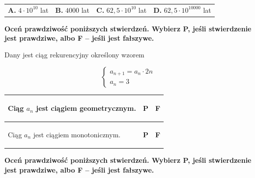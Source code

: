 \documentclass[12pt,a4paper]{article}
\theoremstyle{break}
\begin{document}
	\vspace{0.5cm}
	\begin{tabular}{p{3.5cm} p{3.5cm} p{3.5cm} p{3.5cm}}
		\textbf{A. }$4\cdot10^{10}$ lat&
		\textbf{B. }$4000$ lat&
		\textbf{C. }$62,5\cdot10^{10}$ lat&
		\textbf{D. }$62,5\cdot 10^{10000} $ lat\\
	\end{tabular}
	\newpage
	
	
	\begin{zad}[0-1]
		\textbf{Oceń prawdziwość poniższych stwierdzeń. Wybierz P, jeśli stwierdzenie jest prawdziwe, albo F – jeśli jest fałszywe.}
	\end{zad} 
	
	Dany jest ciąg rekurencyjny określony wzorem
	
	$$\left\{\begin{array}{l}
		a_{n+1}=a_n\cdot2n\\
		a_n=3
	\end{array}\right.$$
	
	\vspace{0.5cm}
	\begin{tabular}{|p{12.5cm}|p{1cm}|p{1cm}|}

		\hline
		\begin{flushleft}
			Ciąg $a_n$ jest ciągiem geometrycznym.
		\end{flushleft}&\begin{center}
			\textbf{P}
		\end{center}&\begin{center}
		\textbf{F}
	\end{center}\\
		\hline
		\begin{flushleft}
			Ciąg $a_n$ jest ciągiem monotonicznym.
		\end{flushleft}&\begin{center}
			\textbf{P}
		\end{center}&\begin{center}
			\textbf{F}
		\end{center}\\
		\hline
	\end{tabular}

	
	\begin{zad}[0-1]
		\textbf{Oceń prawdziwość poniższych stwierdzeń. Wybierz P, jeśli stwierdzenie jest prawdziwe, albo F – jeśli jest fałszywe.}
	\end{zad} 
\end{document}

